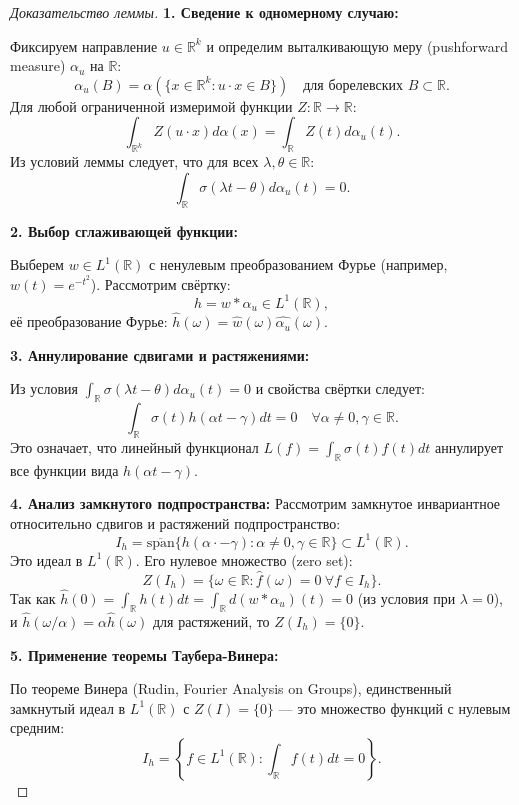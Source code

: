 \documentclass[../NDCNNAI_main.tex]{subfiles}
\begin{document}
\begin{proof}[Доказательство леммы]
\leavevmode
\textbf{1. Сведение к одномерному случаю:}

Фиксируем направление $u \in \mathbb{R}^k$ и определим выталкивающую меру (pushforward measure) $\alpha_u$ на $\mathbb{R}$:
\[
\alpha_u(B) = \alpha(\{x \in \mathbb{R}^k\colon u \cdot x \in B\}) \quad \text{для борелевских } B \subset \mathbb{R}.
\]
Для любой ограниченной измеримой функции $Z\colon \mathbb{R} \to \mathbb{R}$:
\[
\int_{\mathbb{R}^k} Z(u \cdot x) d\alpha(x) = \int_{\mathbb{R}} Z(t) d\alpha_u(t).
\]
Из условий леммы следует, что для всех $\lambda, \theta \in \mathbb{R}$:
\[
\int_{\mathbb{R}} \sigma(\lambda t - \theta) d\alpha_u(t) = 0.
\]

\noindent
\textbf{2. Выбор сглаживающей функции:}

Выберем $w \in L^1(\mathbb{R})$ с ненулевым преобразованием Фурье (например, $w(t) = e^{-t^2}$). Рассмотрим свёртку:
\[
h = w * \alpha_u \in L^1(\mathbb{R}),
\]
её преобразование Фурье: $\widehat{h}(\omega) = \widehat{w}(\omega) \widehat{\alpha_u}(\omega)$.

\noindent
\textbf{3. Аннулирование сдвигами и растяжениями:}

Из условия $\int_{\mathbb{R}} \sigma(\lambda t - \theta) d\alpha_u(t) = 0$ и свойства свёртки следует:
\[
\int_{\mathbb{R}} \sigma(t) h(\alpha t - \gamma) dt = 0 \quad \forall \alpha \neq 0, \gamma \in \mathbb{R}.
\]
Это означает, что линейный функционал $L(f) = \int_{\mathbb{R}} \sigma(t) f(t) dt$ аннулирует все функции вида $h(\alpha t - \gamma)$.

\noindent
\textbf{4. Анализ замкнутого подпространства:}
Рассмотрим замкнутое инвариантное относительно сдвигов и растяжений подпространство:
\[
I_h = \overline{\text{span}}\{h(\alpha \cdot - \gamma): \alpha \neq 0, \gamma \in \mathbb{R}\} \subset L^1(\mathbb{R}).
\]
Это идеал в $L^1(\mathbb{R})$. Его нулевое множество (zero set):
\[
Z(I_h) = \{\omega \in \mathbb{R}\colon \widehat{f}(\omega) = 0 \ \forall f \in I_h\}.
\]
Так как $\widehat{h}(0) = \int_{\mathbb{R}} h(t) dt = \int_{\mathbb{R}} d(w * \alpha_u)(t) = 0$ (из условия при $\lambda = 0$), и $\widehat{h}(\omega/\alpha) = \alpha \widehat{h}(\omega)$ для растяжений, то $Z(I_h) = \{0\}$.

\noindent
\textbf{5. Применение теоремы Таубера-Винера:}

По теореме Винера (Rudin, Fourier Analysis on Groups), единственный замкнутый идеал в $L^1(\mathbb{R})$ с $Z(I) = \{0\}$ --- это множество функций с нулевым средним:
\[
I_h = \left\{f \in L^1(\mathbb{R})\colon \int_{\mathbb{R}} f(t) dt = 0\right\}.
\]


\end{proof}
\end{document}
